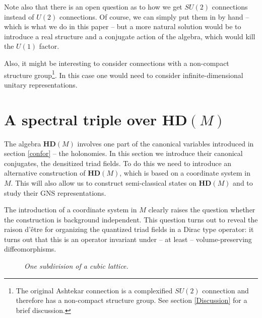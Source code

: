 \documentclass[12pt]{article}
\begin{document}


Note also that there is an open question as to how we get $SU(2)$ connections instead of $U(2)$ connections. Of course, we can simply put them in by hand -- which is what we do in this paper -- but a more natural solution would be to introduce a real structure and a conjugate action of the algebra, which would kill the $U(1)$ factor.

Also, it might be interesting to consider  connections with a non-compact structure group\footnote{The original Ashtekar connection is a complexified $SU(2)$ connection and therefore has a non-compact structure group. See section \ref{Discussion} for a brief discussion.}. In this case one would need to consider infinite-dimensional unitary representations.




\section{A spectral triple over $\mathbf{HD}(M) $ }

The algebra $\mathbf{HD}(M) $ involves one part of the canonical variables introduced in section \ref{confor} -- the holonomies. In this section we introduce their canonical conjugates, the densitized triad fields. 
To do this we need to introduce an alternative construction of $\mathbf{HD}(M) $, which is based on a coordinate system in $M$. This will also allow us to construct semi-classical states on $\mathbf{HD}(M) $ and to study their GNS representations.


The introduction of a coordinate system in $M$ clearly raises the question whether the construction is background independent. This question turns out to reveal the raison d'\^etre for organizing the quantized triad fields in a Dirac type operator: it turns out that this is an operator invariant under -- at least -- volume-preserving diffeomorphisms.



\begin{figure}[t]
\begin{center}
\resizebox{!}{2.5cm}{
 }
\end{center}
\caption{\it One subdivision of a cubic lattice.}
 \label{ronnie}
\end{figure}
\end{document}
